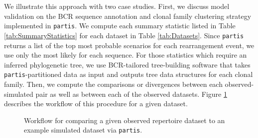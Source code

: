 \documentclass{article}
\begin{document}
We illustrate this approach with two case studies.
First, we discuss model validation on the BCR sequence annotation and clonal family clustering strategy implemented in \texttt{partis}\cite{Ralph2016-nw, Ralph2016-iz}.
We compute each summary statistic listed in Table \ref{tab:SummaryStatistics} for each dataset in Table \ref{tab:Datasets}.
Since \texttt{partis} returns a list of the top most probable scenarios for each rearrangement event, we use only the most likely for each sequence.
For those statistics which require an inferred phylogenetic tree, we use BCR-tailored tree-building software that takes \texttt{partis}-partitioned data as input and outputs tree data structures for each clonal family.
Then, we compute the comparisons or divergences between each observed-simulated pair as well as between each of the observed datasets.
Figure \ref{PartisWorkflow} describes the workflow of this procedure for a given dataset.
\begin{figure}
\begin{adjustbox}{max totalsize={\textwidth}{.5\textheight},center}
\end{adjustbox}
\caption{Workflow for comparing a given observed repertoire dataset to an example simulated dataset via \texttt{partis}.}
\label{PartisWorkflow}
\end{figure}
\end{document}
